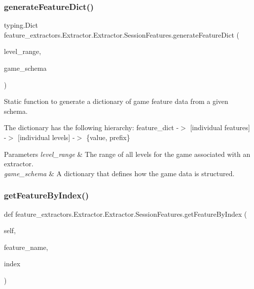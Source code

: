 \subsubsection{\texorpdfstring{generateFeatureDict()}{generateFeatureDict()}}
{\footnotesize\ttfamily  typing.\+Dict feature\+\_\+extractors.\+Extractor.\+Extractor.\+Session\+Features.\+generate\+Feature\+Dict (\begin{DoxyParamCaption}\item[{range}]{level\+\_\+range,  }\item[{\mbox{\hyperlink{classschemas_1_1_schema_1_1_schema}{Schema}}}]{game\+\_\+schema }\end{DoxyParamCaption})\hspace{0.3cm}{\ttfamily [static]}}



Static function to generate a dictionary of game feature data from a given schema. 

The dictionary has the following hierarchy\+: feature\+\_\+dict -\/$>$ \mbox{[}individual features\mbox{]} -\/$>$ \mbox{[}individual levels\mbox{]} -\/$>$ \{value, prefix\}


\begin{DoxyParams}{Parameters}
{\em level\+\_\+range} & The range of all levels for the game associated with an extractor. \\
\hline
{\em game\+\_\+schema} & A dictionary that defines how the game data is structured. \\
\hline
\end{DoxyParams}
\mbox{\label{classfeature__extractors_1_1_extractor_1_1_extractor_1_1_session_features_a661173b55a36766ad239d447e9bbcf4b}} 
\subsubsection{\texorpdfstring{getFeatureByIndex()}{getFeatureByIndex()}}
{\footnotesize\ttfamily def feature\+\_\+extractors.\+Extractor.\+Extractor.\+Session\+Features.\+get\+Feature\+By\+Index (\begin{DoxyParamCaption}\item[{}]{self,  }\item[{str}]{feature\+\_\+name,  }\item[{int}]{index }\end{DoxyParamCaption})}



